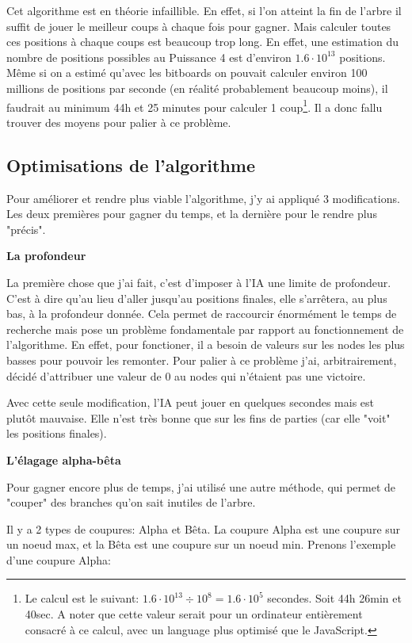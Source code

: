 \documentclass[a4paper]{article}
\newcommand{\ptitle}[1]{\vspace{10pt}
{\large \noindent \textbf{#1}}}
\begin{document}
    Cet algorithme est en théorie infaillible. En effet, si l'on atteint la fin de l'arbre il suffit de jouer le meilleur coups à chaque fois pour gagner. Mais calculer toutes ces positions à chaque coups est beaucoup trop long. En effet, une estimation du nombre de positions possibles au Puissance 4 est d'environ \textbf{$1.6\cdot10^{13}$} positions. Même si on a estimé qu'avec les bitboards on pouvait calculer environ 100 millions de positions par seconde (en réalité probablement beaucoup moins), il faudrait au minimum 44h et 25 minutes pour calculer 1 coup\footnote{Le calcul est le suivant: $1.6\cdot10^{13}\div10^{8} = 1.6\cdot10^{5}$ secondes. Soit 44h 26min et 40sec. A noter que cette valeur serait pour un ordinateur entièrement consacré à ce calcul, avec un language plus optimisé que le JavaScript.}. Il a donc fallu trouver des moyens pour palier à ce problème.

\subsection{Optimisations de l'algorithme}

    Pour améliorer et rendre plus viable l'algorithme, j'y ai appliqué 3 modifications. Les deux premières pour gagner du temps, et la dernière pour le rendre plus "précis".

    \ptitle{La profondeur}

    La première chose que j'ai fait, c'est d'imposer à l'IA une limite de profondeur. C'est à dire qu'au lieu d'aller jusqu'au positions finales, elle s'arrêtera, au plus bas, à la profondeur donnée. Cela permet de raccourcir énormément le temps de recherche mais pose un problème fondamentale par rapport au fonctionnement de l'algorithme. En effet, pour fonctioner, il a besoin de valeurs sur les nodes les plus basses pour pouvoir les remonter. Pour palier à ce problème j'ai, arbitrairement, décidé d'attribuer une valeur de 0 au nodes qui n'étaient pas une victoire.

    Avec cette seule modification, l'IA peut jouer en quelques secondes mais est plutôt mauvaise. Elle n'est très bonne que sur les fins de parties (car elle "voit" les positions finales).

    \ptitle{L'élagage alpha-bêta}

    Pour gagner encore plus de temps, j'ai utilisé une autre méthode, qui permet de "couper" des branches qu'on sait inutiles de l'arbre.

    Il y a 2 types de coupures: Alpha et Bêta. La coupure Alpha est une coupure sur un noeud max, et la Bêta est une coupure sur un noeud min. Prenons l'exemple d'une coupure Alpha: 
\end{document}
